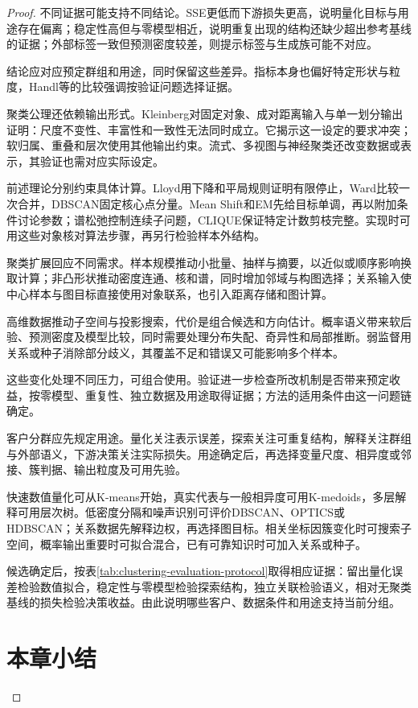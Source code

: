 \begin{proof}
不同证据可能支持不同结论。SSE更低而下游损失更高，说明量化目标与用途存在偏离；稳定性高但与零模型相近，说明重复出现的结构还缺少超出参考基线的证据；外部标签一致但预测密度较差，则提示标签与生成族可能不对应。

结论应对应预定群组和用途，同时保留这些差异。指标本身也偏好特定形状与粒度，Handl等的比较强调按验证问题选择证据。


聚类公理还依赖输出形式。Kleinberg对固定对象、成对距离输入与单一划分输出证明：尺度不变性、丰富性和一致性无法同时成立。它揭示这一设定的要求冲突；软归属、重叠和层次使用其他输出约束。流式、多视图与神经聚类还改变数据或表示，其验证也需对应实际设定。

前述理论分别约束具体计算。Lloyd用下降和平局规则证明有限停止，Ward比较一次合并，DBSCAN固定核心点分量。Mean Shift和EM先给目标单调，再以附加条件讨论参数；谱松弛控制连续子问题，CLIQUE保证特定计数剪枝完整。实现时可用这些对象核对算法步骤，再另行检验样本外结构。

聚类扩展回应不同需求。样本规模推动小批量、抽样与摘要，以近似或顺序影响换取计算；非凸形状推动密度连通、核和谱，同时增加邻域与构图选择；关系输入使中心样本与图目标直接使用对象联系，也引入距离存储和图计算。

高维数据推动子空间与投影搜索，代价是组合候选和方向估计。概率语义带来软后验、预测密度及模型比较，同时需要处理分布失配、奇异性和局部推断。弱监督用关系或种子消除部分歧义，其覆盖不足和错误又可能影响多个样本。

这些变化处理不同压力，可组合使用。验证进一步检查所改机制是否带来预定收益，按零模型、重复性、独立数据及用途取得证据；方法的适用条件由这一问题链确定。

客户分群应先规定用途。量化关注表示误差，探索关注可重复结构，解释关注群组与外部语义，下游决策关注实际损失。用途确定后，再选择变量尺度、相异度或邻接、簇判据、输出粒度及可用先验。

快速数值量化可从K-means开始，真实代表与一般相异度可用K-medoids，多层解释可用层次树。低密度分隔和噪声识别可评价DBSCAN、OPTICS或HDBSCAN；关系数据先解释边权，再选择图目标。相关坐标因簇变化时可搜索子空间，概率输出重要时可拟合混合，已有可靠知识时可加入关系或种子。

候选确定后，按表\ref{tab:clustering-evaluation-protocol}取得相应证据：留出量化误差检验数值拟合，稳定性与零模型检验探索结构，独立关联检验语义，相对无聚类基线的损失检验决策收益。由此说明哪些客户、数据条件和用途支持当前分组。

\section{本章小结}
\label{sec:clustering-summary}


\end{proof}
